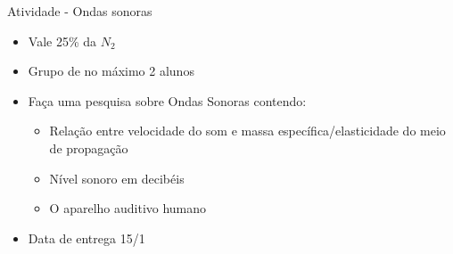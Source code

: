 \begin{frame}{Atividade - Ondas sonoras}
    \begin{itemize}
        \item Vale 25\% da \(N_2\)
        \item Grupo de no máximo 2 alunos
        \item Faça uma pesquisa sobre Ondas Sonoras contendo:
            \begin{itemize}
                \item Relação entre velocidade do som e massa específica/elasticidade do meio de propagação
                \item Nível sonoro em decibéis
                \item O aparelho auditivo humano
            \end{itemize}
        \item Data de entrega 15/1
    \end{itemize}
\end{frame}
